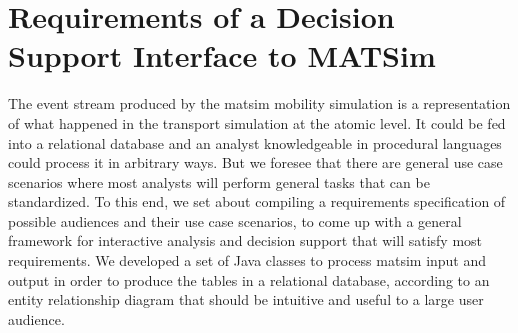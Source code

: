 \section{Requirements of a Decision Support Interface to MATSim}
\label{sec:analyticsRequirements}
The event stream produced by the \gls{matsim} mobility simulation is a representation of what happened in the transport simulation at the atomic level. It could be fed into a relational database and an analyst knowledgeable in procedural languages could process it in arbitrary ways. But we foresee that there are general use case scenarios where most analysts will perform general tasks that can be standardized. To this end, we set about compiling a requirements specification of possible audiences and their use case scenarios, to come up with a general framework for interactive analysis and decision support that will satisfy most requirements. We developed a set of Java classes to process \gls{matsim} input and output in order to produce the tables in a relational database, according to an entity relationship diagram that should be intuitive and useful to a large user audience.

